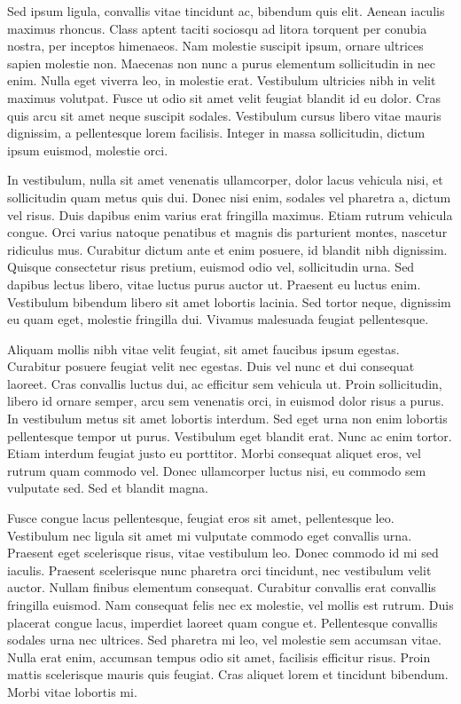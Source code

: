 \documentclass{article}
\begin{document}
Sed ipsum ligula, convallis vitae tincidunt ac, bibendum quis elit. Aenean iaculis maximus rhoncus. Class aptent taciti sociosqu ad litora torquent per conubia nostra, per inceptos himenaeos. Nam molestie suscipit ipsum, ornare ultrices sapien molestie non. Maecenas non nunc a purus elementum sollicitudin in nec enim. Nulla eget viverra leo, in molestie erat. Vestibulum ultricies nibh in velit maximus volutpat. Fusce ut odio sit amet velit feugiat blandit id eu dolor. Cras quis arcu sit amet neque suscipit sodales. Vestibulum cursus libero vitae mauris dignissim, a pellentesque lorem facilisis. Integer in massa sollicitudin, dictum ipsum euismod, molestie orci.

In vestibulum, nulla sit amet venenatis ullamcorper, dolor lacus vehicula nisi, et sollicitudin quam metus quis dui. Donec nisi enim, sodales vel pharetra a, dictum vel risus. Duis dapibus enim varius erat fringilla maximus. Etiam rutrum vehicula congue. Orci varius natoque penatibus et magnis dis parturient montes, nascetur ridiculus mus. Curabitur dictum ante et enim posuere, id blandit nibh dignissim. Quisque consectetur risus pretium, euismod odio vel, sollicitudin urna. Sed dapibus lectus libero, vitae luctus purus auctor ut. Praesent eu luctus enim. Vestibulum bibendum libero sit amet lobortis lacinia. Sed tortor neque, dignissim eu quam eget, molestie fringilla dui. Vivamus malesuada feugiat pellentesque.

Aliquam mollis nibh vitae velit feugiat, sit amet faucibus ipsum egestas. Curabitur posuere feugiat velit nec egestas. Duis vel nunc et dui consequat laoreet. Cras convallis luctus dui, ac efficitur sem vehicula ut. Proin sollicitudin, libero id ornare semper, arcu sem venenatis orci, in euismod dolor risus a purus. In vestibulum metus sit amet lobortis interdum. Sed eget urna non enim lobortis pellentesque tempor ut purus. Vestibulum eget blandit erat. Nunc ac enim tortor. Etiam interdum feugiat justo eu porttitor. Morbi consequat aliquet eros, vel rutrum quam commodo vel. Donec ullamcorper luctus nisi, eu commodo sem vulputate sed. Sed et blandit magna.

Fusce congue lacus pellentesque, feugiat eros sit amet, pellentesque leo. Vestibulum nec ligula sit amet mi vulputate commodo eget convallis urna. Praesent eget scelerisque risus, vitae vestibulum leo. Donec commodo id mi sed iaculis. Praesent scelerisque nunc pharetra orci tincidunt, nec vestibulum velit auctor. Nullam finibus elementum consequat. Curabitur convallis erat convallis fringilla euismod. Nam consequat felis nec ex molestie, vel mollis est rutrum. Duis placerat congue lacus, imperdiet laoreet quam congue et. Pellentesque convallis sodales urna nec ultrices. Sed pharetra mi leo, vel molestie sem accumsan vitae. Nulla erat enim, accumsan tempus odio sit amet, facilisis efficitur risus. Proin mattis scelerisque mauris quis feugiat. Cras aliquet lorem et tincidunt bibendum. Morbi vitae lobortis mi.
\end{document}
